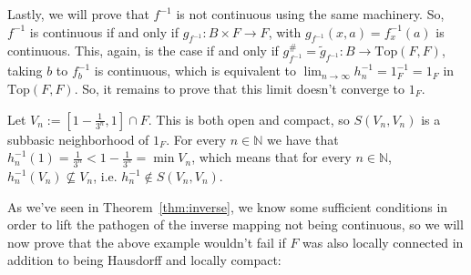 \begin{example}
Lastly, we will prove that $f^{-1}$ is not continuous using the same machinery. So, $f^{-1}$ is continuous if and only if $g_{f^{-1}}:B\times F\to F$, with $g_{f^{-1}}(x,a)=f^{-1}_x(a)$ is continuous. This, again, is the case if and only if $g_{f^{-1}}^{\#}=\tilde{g}_{f^{-1}}:B\to\mathrm{Top}(F,F)$, taking $b$ to $f_b^{-1}$ is continuous, which is equivalent to $\lim_{n\to\infty}h_n^{-1}=1_F^{-1}=1_F$ in $\mathrm{Top}(F,F)$. So, it remains to prove that this limit doesn't converge to $1_F$.

Let $V_n:=[1-\frac{1}{3^n},1]\cap F$. This is both open and compact, so $S(V_n,V_n)$ is a subbasic neighborhood of $1_F$. For every $n\in\mathbb{N}$ we have that $h_n^{-1}(1)=\frac{1}{3^n}<1-\frac{1}{3^n}=\min V_n$, which means that for every $n\in\mathbb{N}$, $h_n^{-1}(V_n)\not\subseteq V_n$, i.e. $h^{-1}_n\not\in S(V_n,V_n)$.
\end{example}

As we've seen in Theorem~\ref{thm:inverse}, we know some sufficient conditions in order to lift the pathogen of the inverse mapping not being continuous, so we will now prove that the above example wouldn't fail if $F$ was also locally connected in addition to being Hausdorff and locally compact:


